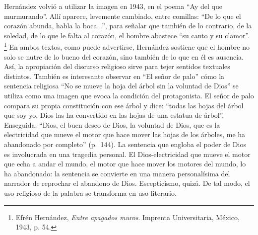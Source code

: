 \documentclass[14pt,twoside,final]{extbook} %
\let\oldfootnote\footnote
\renewcommand\footnote[1]{%
\oldfootnote{\hspace{1mm}#1}}
\begin{document}
Hernández volvió a utilizar la imagen en 1943, en el poema ``Ay del que murmurando''. Allí aparece, levemente cambiado, entre comillas: ``De lo que el corazón abunda, habla la boca...'', para señalar que también de lo contrario, de la soledad, de lo que le falta al corazón, el hombre abastece ``su canto y su clamor''.\footnote{Efrén Hernández, \emph{Entre apagados muros}. Imprenta Universitaria, México, 1943, p. 54.} En ambos textos, como puede advertirse, Hernández sostiene que el hombre no solo se nutre de lo bueno del corazón, sino también de lo que en él es ausencia. Así, la apropiación del discurso religioso sirve para tejer sentidos textuales distintos. También es interesante observar en ``El señor de palo'' cómo la sentencia religiosa ``No se mueve la hoja del árbol sin la voluntad de Dios'' se utiliza como una imagen que evoca la condición del protagonista. El señor de palo compara su propia constitución con ese árbol y dice: ``todas las hojas del árbol que soy yo, Dios las ha convertido en las hojas de una estatua de árbol''. Enseguida: ``Dios, el buen deseo de Dios, la voluntad de Dios, que es la electricidad que mueve el motor que hace mover las hojas de los árboles, me ha abandonado por completo'' (p.~144). La sentencia que engloba el poder de Dios es involucrada en una tragedia personal. El Dios-electricidad que mueve el motor que echa a andar el mundo, el motor que hace mover los motores del mundo, lo ha abandonado: la sentencia se convierte en una manera personalísima del narrador de reprochar el abandono de Dios. Escepticismo, quizá. De tal modo, el uso religioso de la palabra se transforma en uso literario.
\end{document}
